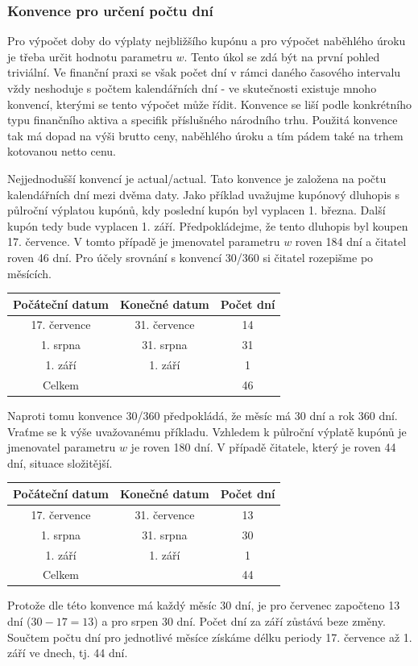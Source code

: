 \documentclass[a4paper]{book}
\begin{document}
\subsubsection{Konvence pro určení počtu dní}

Pro výpočet doby do výplaty nejbližšího kupónu a pro výpočet naběhlého úroku je třeba určit hodnotu parametru $w$. Tento úkol se zdá být na první pohled triviální. Ve finanční praxi se však počet dní v rámci daného časového intervalu vždy neshoduje s počtem kalendářních dní - ve skutečnosti existuje mnoho konvencí, kterými se tento výpočet může řídit. Konvence se liší podle konkrétního typu finančního aktiva a specifik příslušného národního trhu. Použitá konvence tak má dopad na výši brutto ceny, naběhlého úroku a tím pádem také na trhem kotovanou netto cenu.

Nejjednodušší konvencí je actual/actual. Tato konvence je založena na počtu kalendářních dní mezi dvěma daty. Jako příklad uvažujme kupónový dluhopis s půlroční výplatou kupónů, kdy poslední kupón byl vyplacen 1. března. Další kupón tedy bude vyplacen 1. září. Předpokládejme, že tento dluhopis byl koupen 17. července. V tomto případě je jmenovatel parametru $w$ roven 184 dní a čitatel roven 46 dní. Pro účely srovnání s konvencí 30/360 si čitatel rozepišme po měsících.
\begin{center}
\begin{tabular}{c c c}
\textbf{Počáteční datum} & \textbf{Konečné datum} & \textbf{Počet dní}\\
\hline
17. července & 31. července & 14\\
1. srpna & 31. srpna & 31\\
1. září & 1. září & 1\\
Celkem & & 46
\end{tabular}
\end{center}

Naproti tomu konvence 30/360 předpokládá, že měsíc má 30 dní a rok 360 dní. Vraťme se k výše uvažovanému příkladu. Vzhledem k půlroční výplatě kupónů je jmenovatel parametru $w$ je roven 180 dní. V případě čitatele, který je roven 44 dní, situace složitější.
\begin{center}
\begin{tabular}{c c c}
\textbf{Počáteční datum} & \textbf{Konečné datum} & \textbf{Počet dní}\\
\hline
17. července & 31. července & 13\\
1. srpna & 31. srpna & 30\\
1. září & 1. září & 1\\
Celkem & & 44
\end{tabular}
\end{center}
Protože dle této konvence má každý měsíc 30 dní, je pro červenec započteno 13 dní ($30 - 17 = 13$) a pro srpen 30 dní. Počet dní za září zůstává beze změny. Součtem počtu dní pro jednotlivé měsíce získáme délku periody 17. července až 1. září ve dnech, tj. 44 dní.
\end{document}
